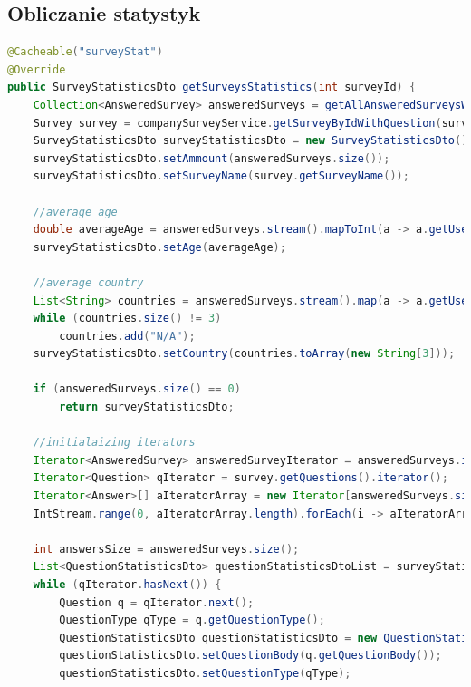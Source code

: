 \documentclass[a4paper]{article}
\begin{document}
\subsection{Obliczanie statystyk}
\begin{lstlisting}[language=Java,tabsize=2,frame=single,breaklines=true]  
@Cacheable("surveyStat")
@Override
public SurveyStatisticsDto getSurveysStatistics(int surveyId) {
	Collection<AnsweredSurvey> answeredSurveys = getAllAnsweredSurveysWithDetails(surveyId);
	Survey survey = companySurveyService.getSurveyByIdWithQuestion(surveyId);
	SurveyStatisticsDto surveyStatisticsDto = new SurveyStatisticsDto();
	surveyStatisticsDto.setAmmount(answeredSurveys.size());
	surveyStatisticsDto.setSurveyName(survey.getSurveyName());

	//average age
	double averageAge = answeredSurveys.stream().mapToInt(a -> a.getUser().getAge()).average().orElse(0.0);
	surveyStatisticsDto.setAge(averageAge);

	//average country
	List<String> countries = answeredSurveys.stream().map(a -> a.getUser().getCountry()).collect(Collectors.groupingBy(Function.identity(), Collectors.counting())).entrySet().stream().sorted(Comparator.comparingLong(Map.Entry::getValue)).limit(3).map(Map.Entry::getKey).collect(Collectors.toList());
	while (countries.size() != 3)
		countries.add("N/A");
	surveyStatisticsDto.setCountry(countries.toArray(new String[3]));
	
	if (answeredSurveys.size() == 0)
		return surveyStatisticsDto;

	//initialaizing iterators
	Iterator<AnsweredSurvey> answeredSurveyIterator = answeredSurveys.iterator();
	Iterator<Question> qIterator = survey.getQuestions().iterator();
	Iterator<Answer>[] aIteratorArray = new Iterator[answeredSurveys.size()];
	IntStream.range(0, aIteratorArray.length).forEach(i -> aIteratorArray[i] = answeredSurveyIterator.next().getAnswersList().iterator());

	int answersSize = answeredSurveys.size();
	List<QuestionStatisticsDto> questionStatisticsDtoList = surveyStatisticsDto.getQuestionWithAnswersList();
	while (qIterator.hasNext()) {
		Question q = qIterator.next();
		QuestionType qType = q.getQuestionType();
		QuestionStatisticsDto questionStatisticsDto = new QuestionStatisticsDto();
		questionStatisticsDto.setQuestionBody(q.getQuestionBody());
		questionStatisticsDto.setQuestionType(qType);


\end{lstlisting}
\end{document}
